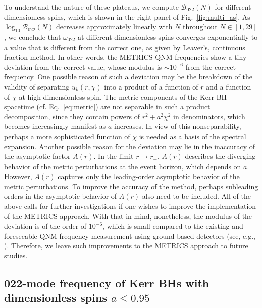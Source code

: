\documentclass[aps,prx,amsmath,floats,floatfix,twocolumn,
  superscriptaddress,nofootinbib,showpacs]{revtex4-1}
\begin{document}
To understand the nature of these plateaus, we compute $\mathcal{B}_{022}(N)$ for different dimensionless spins, which is shown in the right panel of Fig.~\ref{fig:multi_as}. 
As $\log_{10} \mathcal{B}_{022}(N)$ decreases approximately linearly with $N$ throughout $N \in [1, 29]$, we conclude that $\omega_{022}$ at different dimensionless spins converges exponentially to a value that is different from the correct one, as given by Leaver's, continuous fraction method.
In other words, the METRICS QNM frequencies show a tiny deviation from the correct value, whose modulus is $\sim 10^{-6}$ from the correct frequency. 
One possible reason of such a deviation may be the breakdown of the validity of separating $u_k(r, \chi)$ into a product of a function of $r$ and a function of $\chi$ at high dimensionless spin. 
The metric components of the Kerr BH spacetime (cf. Eq.~\eqref{eq:metric}) are not separable in such a product decomposition, since they contain powers of $r^2 + a^2 \chi^2$ in denominators, which becomes increasingly manifest as $a$ increases.
In view of this nonseparability, perhaps a more sophisticated function of $\chi$ is needed as a basis of the spectral expansion.
Another possible reason for the deviation may lie in the inaccuracy of the asymptotic factor $A(r)$. 
In the limit $r\rightarrow r_+$, $A(r)$ describes the diverging behavior of the metric perturbations at the event horizon, which depends on $a$. 
However, $A(r)$ captures only the leading-order asymptotic behavior of the metric perturbations. 
To improve the accuracy of the method, perhaps subleading orders in the asymptotic behavior of $A(r)$ also need to be included. 
All of the above calls for further investigations if one wishes to improve the implementation of the METRICS approach. 
With that in mind, nonetheless, the modulus of the deviation is of the order of $10^{-6}$, which is small compared to the existing and foreseeable QNM frequency measurement using ground-based detectors (see, e.g., \cite{LIGOScientific:2021sio}). 
Therefore, we leave such improvements to the METRICS approach to future studies. 

\subsection{022-mode frequency of Kerr BHs with dimensionless spins $a \leq 0.95$}
\end{document}
